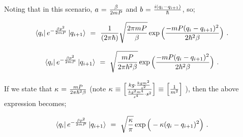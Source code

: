\documentclass{article}
\begin{document}
Noting that in this scenario, \begin{math} a \hspace{0.025cm} = \hspace{0.025cm} \frac{\beta}{2 m P} \end{math} and \begin{math} b \hspace{0.025cm} = \hspace{0.025cm} \frac{i (q_i - q_{i + 1})}{\hbar} \end{math}, so;

\begin{equation} \label{eb-eq-1-205}
\bra{q_i} e^{ - \frac{ \beta p^2}{2 m P}} \ket{q_{i+1}} \hspace{0.125cm} = \hspace{0.125cm} \frac{1}{(2 \pi \hbar)} \sqrt{\frac{2 \pi m P}{\beta}} \exp{\Big( \frac{ - m P (q_i - q_{i+1})^2}{2 \hbar^2 \beta}\Big)}  \hspace{0.125cm} .
\end{equation}

\begin{equation} \label{eb-eq-1-206}
\bra{q_i} e^{ - \frac{ \beta p^2}{2 m P}} \ket{q_{i+1}} \hspace{0.125cm} = \hspace{0.125cm} \sqrt{\frac{m P}{2 \pi \hbar^2 \beta}} \exp{\Big( \frac{ - m P (q_i - q_{i+1})^2}{2 \hbar^2 \beta}\Big)} \hspace{0.125cm} .
\end{equation}

If we state that \begin{math} \kappa \hspace{0.025cm} = \hspace{0.025cm} \frac{m P}{2 \pi \hbar^2 \beta} \end{math} (note \begin{math} \kappa \hspace{0.025cm} \equiv \hspace{0.025cm} \Big[ \frac{kg \cdot \frac{kg m^2}{s^2}}{\frac{kg^2 m^4}{s^4} \cdot s^2}  \Big] \hspace{0.025cm} \equiv \hspace{0.025cm} \Big[ \frac{1}{m^2} \Big]  \end{math} ), then the above expression becomes;

\begin{equation} \label{eb-eq-1-207}
\bra{q_i} e^{ - \frac{ \beta p^2}{2 m P}} \ket{q_{i+1}} \hspace{0.125cm} = \hspace{0.125cm} \sqrt{\frac{\kappa}{\pi}} \exp{\Big( - \kappa (q_i - q_{i+1})^2 \Big)} \hspace{0.125cm} .
\end{equation}
\end{document}
